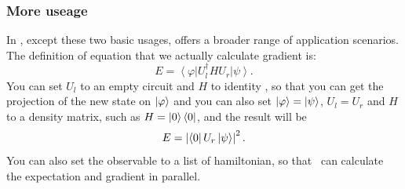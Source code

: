 \subsubsection{More useage}
In \MindQuantum, except these two basic usages, \getexpectationwithgrad offers a broader range of application scenarios. The definition of equation that we actually calculate gradient is:
\begin{equation}
  E = \left<\varphi\right|U_l^\dagger H U_r \left|\psi\right>.
\end{equation}
You can set $U_l$ to an empty circuit and $H$ to identity \QubitOperator, so that you can get the projection of the new state on $\ket{\varphi}$ and you can also set $\ket{\varphi}=\ket{\psi}$, $U_l = U_r$ and $H$ to a density matrix, such as $H = \ket{0}\bra{0}$, and the result will be
\begin{equation}
  E=\left|\bra{0}U_r\ket{\psi}\right|^2.
\end{equation}
You can also set the observable to a list of hamiltonian, so that \MindQuantum\ can calculate the expectation and gradient in parallel.
